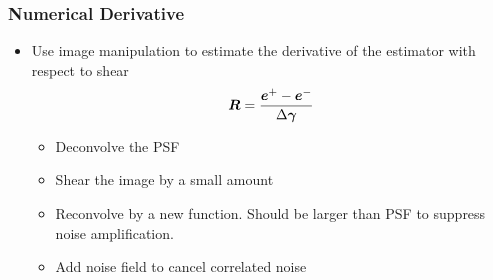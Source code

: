 \documentclass{beamer}
\newcommand{\mcalR}{\mbox{\boldmath $R$}}
\newcommand{\vecg}{\mbox{\boldmath $\gamma$}}
\newcommand{\vest}{\mbox{\boldmath $e$}}
\begin{document}
\frame
{
 
    \frametitle{Numerical Derivative}

       \begin{itemize}

        \item Use image manipulation to estimate the derivative of the
            estimator with respect to shear
            {\color{gold}
                \begin{equation}
                    \mcalR = \frac{\vest^+ - \vest^-}{\Delta \vecg} \nonumber 
                \end{equation}
            }
            \begin{itemize}
                \item Deconvolve the PSF
                \item Shear the image by a small amount
                \item Reconvolve by a new function.  Should be larger than PSF to suppress
                    noise amplification. 
                \item {\color{lightsteelblue} Add noise field to cancel correlated noise}
            \end{itemize}


    \end{itemize}

}
\end{document}
